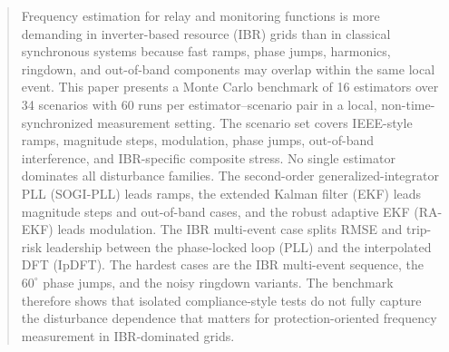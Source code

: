 \begin{abstract}
Frequency estimation for relay and monitoring functions is more demanding in
inverter-based resource (IBR) grids than in classical synchronous systems
because fast ramps, phase jumps, harmonics, ringdown, and out-of-band
components may overlap within the same local event. This paper presents a Monte
Carlo benchmark of 16 estimators over 34 scenarios with 60 runs per
estimator--scenario pair in a local, non-time-synchronized measurement
setting. The scenario set covers IEEE-style ramps, magnitude steps,
modulation, phase jumps, out-of-band interference, and IBR-specific composite
stress. No single estimator dominates all disturbance families. The
second-order generalized-integrator PLL (SOGI-PLL) leads ramps, the extended
Kalman filter (EKF) leads magnitude steps and out-of-band cases, and the
robust adaptive EKF (RA-EKF) leads modulation. The IBR multi-event case splits
RMSE and trip-risk leadership between the phase-locked loop (PLL) and the
interpolated DFT (IpDFT). The hardest cases are the IBR multi-event sequence,
the $60^\circ$ phase jumps, and the noisy ringdown variants. The benchmark
therefore shows that isolated compliance-style tests do not fully capture the
disturbance dependence that matters for protection-oriented frequency
measurement in IBR-dominated grids.
\end{abstract}
